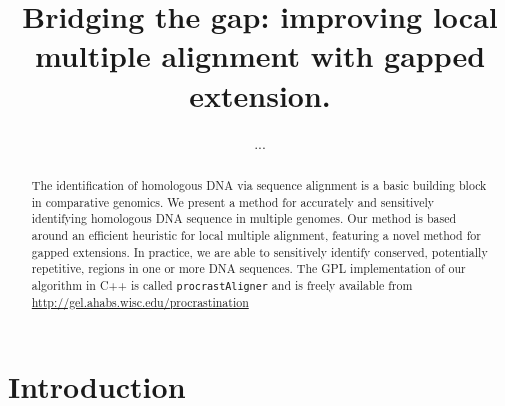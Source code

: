 \documentclass{llncs}
\begin{document}
\renewcommand{\labelenumi}{(\Alph{enumi})}
\renewcommand{\labelenumii}{(\alph{enumii})}

\frontmatter          %
%
\pagestyle{headings}  %

\mainmatter              %
%
\title{Bridging the gap: improving local multiple alignment with gapped extension.}
%
\author{...}

%

\maketitle


\begin{abstract}
The identification of homologous DNA via sequence alignment is a basic building block in comparative genomics.  We present a method for accurately and sensitively identifying homologous DNA sequence in multiple genomes. Our method is based around an efficient heuristic for local multiple alignment, featuring a novel method for gapped extensions. In practice, we are able to sensitively identify conserved, potentially repetitive, regions in one or more DNA sequences.  The GPL implementation of our algorithm in C++ is
called \texttt{procrastAligner} and is freely available from
\url{http://gel.ahabs.wisc.edu/procrastination}
\end{abstract}




\section{ Introduction }
\end{document}
